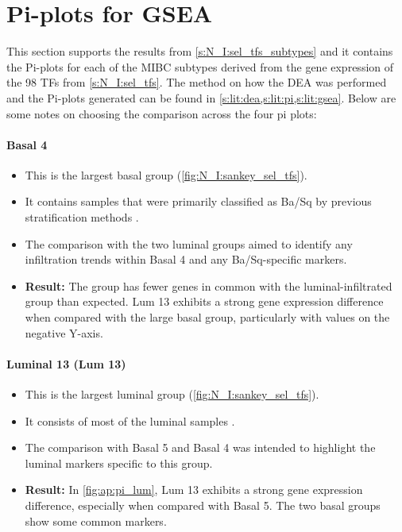 \section{Pi-plots for GSEA} \label{s:ap:sel_prun_pi}

This section supports the results from \cref{s:N_I:sel_tfs_subtypes} and it contains the Pi-plots for each of the MIBC subtypes derived from the gene expression of the 98 TFs from \cref{s:N_I:sel_tfs}. The method on how the DEA was performed and the Pi-plots generated can be found in \cref{s:lit:dea,s:lit:pi,s:lit:gsea}. Below are some notes on choosing the comparison across the four pi plots:

\paragraph*{Basal 4}

\begin{itemize}
    \item This is the largest basal group (\cref{fig:N_I:sankey_sel_tfs}).
    \item It contains samples that were primarily classified as Ba/Sq by previous stratification methods \citep{Robertson2017-mg,Kamoun2020-tj,Marzouka2018-ge}.
    \item The comparison with the two luminal groups aimed to identify any infiltration trends within Basal 4 and any Ba/Sq-specific markers.
    \item \textbf{Result:} The group has fewer genes in common with the luminal-infiltrated group than expected. Lum 13 exhibits a strong gene expression difference when compared with the large basal group, particularly with values on the negative Y-axis.
\end{itemize}
    
\paragraph*{Luminal 13 (Lum 13)}

\begin{itemize}
    \item This is the largest luminal group (\cref{fig:N_I:sankey_sel_tfs}).
    \item It consists of most of the luminal samples \citep{Robertson2017-mg,Kamoun2020-tj,Marzouka2018-ge}.
    \item The comparison with Basal 5 and Basal 4 was intended to highlight the luminal markers specific to this group.
    \item \textbf{Result:} In \cref{fig:ap:pi_lum}, Lum 13 exhibits a strong gene expression difference, especially when compared with Basal 5. The two basal groups show some common markers.
\end{itemize}

